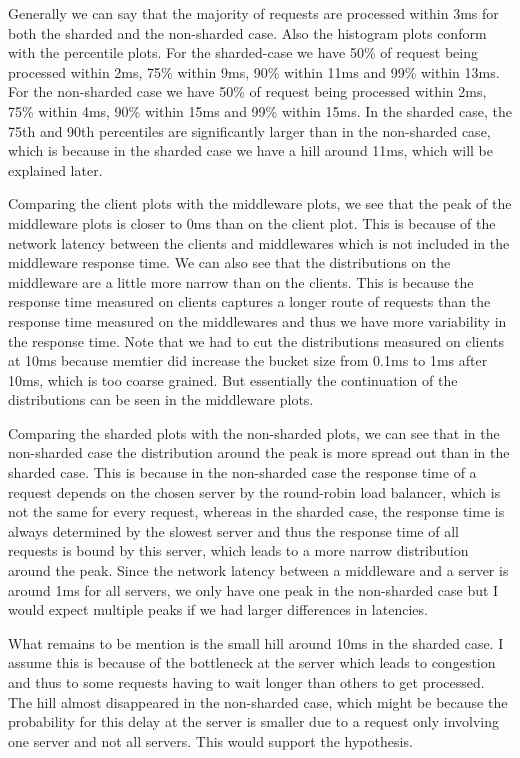 Generally we can say that the majority of requests are processed within 3ms for both the sharded and the non-sharded case. Also the histogram plots conform with the percentile plots. For the sharded-case we have 50\% of request being processed within 2ms, 75\% within 9ms, 90\% within 11ms and 99\% within 13ms. For the non-sharded case we have 50\% of request being processed within 2ms, 75\% within 4ms, 90\% within 15ms and 99\% within 15ms. In the sharded case, the 75th and 90th percentiles are significantly larger than in the non-sharded case, which is because in the sharded case we have a hill around 11ms, which will be explained later.

Comparing the client plots with the middleware plots, we see that the peak of the middleware plots is closer to  0ms than on the client plot. This is because of the network latency between the clients and middlewares which is not included in the middleware response time. We can also see that the distributions on the middleware are a little more narrow than on the clients. This is because the response time measured on clients captures a longer route of requests than the response time measured on the middlewares and thus we have more variability in the response time. Note that we had to cut the distributions measured on clients at 10ms because memtier did increase the bucket size from 0.1ms to 1ms after 10ms, which is too coarse grained. But essentially the continuation of the distributions can be seen in the middleware plots.

Comparing the sharded plots with the non-sharded plots, we can see that in the non-sharded case the distribution around the peak is more spread out than in the sharded case. This is because in the non-sharded case the response time of a request depends on the chosen server by the round-robin load balancer, which is not the same for every request, whereas in the sharded case, the response time is always determined by the slowest server and thus the response time of all requests is bound by this server, which leads to a more narrow distribution around the peak. Since the network latency between a middleware and a server is around 1ms for all servers, we only have one peak in the non-sharded case but I would expect multiple peaks if we had larger differences in latencies. 

What remains to be mention is the small hill around 10ms in the sharded case. I assume this is because of the bottleneck at the server which leads to congestion and thus to some requests having to wait longer than others to get processed. The hill almost disappeared in the non-sharded case, which might be because the probability for this delay at the server is smaller due to a request only involving one server and not all servers. This would support the hypothesis. 

